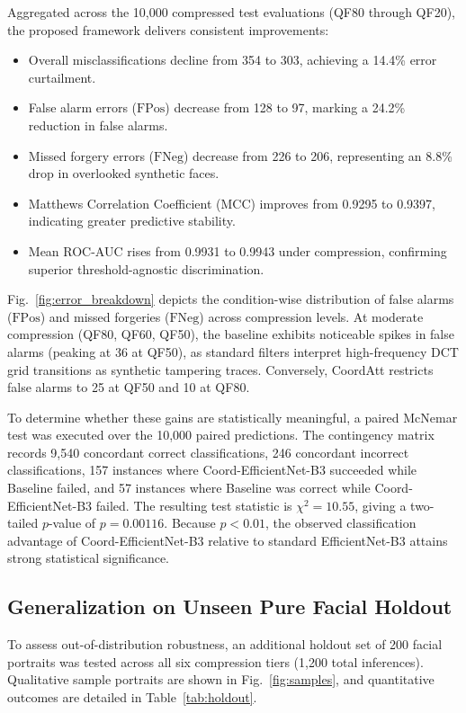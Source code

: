 \documentclass[conference]{IEEEtran}
\begin{document}
Aggregated across the 10,000 compressed test evaluations (QF80 through QF20), the proposed framework delivers consistent improvements:
\begin{itemize}
    \item Overall misclassifications decline from 354 to 303, achieving a 14.4\% error curtailment.
    \item False alarm errors ($\text{FPos}$) decrease from 128 to 97, marking a 24.2\% reduction in false alarms.
    \item Missed forgery errors ($\text{FNeg}$) decrease from 226 to 206, representing an 8.8\% drop in overlooked synthetic faces.
    \item Matthews Correlation Coefficient ($\text{MCC}$) improves from 0.9295 to 0.9397, indicating greater predictive stability.
    \item Mean ROC-AUC rises from 0.9931 to 0.9943 under compression, confirming superior threshold-agnostic discrimination.
\end{itemize}

Fig.~\ref{fig:error_breakdown} depicts the condition-wise distribution of false alarms ($\text{FPos}$) and missed forgeries ($\text{FNeg}$) across compression levels. At moderate compression (QF80, QF60, QF50), the baseline exhibits noticeable spikes in false alarms (peaking at 36 at QF50), as standard filters interpret high-frequency DCT grid transitions as synthetic tampering traces. Conversely, CoordAtt restricts false alarms to 25 at QF50 and 10 at QF80.

To determine whether these gains are statistically meaningful, a paired McNemar test was executed over the 10,000 paired predictions. The contingency matrix records 9,540 concordant correct classifications, 246 concordant incorrect classifications, 157 instances where Coord-EfficientNet-B3 succeeded while Baseline failed, and 57 instances where Baseline was correct while Coord-EfficientNet-B3 failed. The resulting test statistic is $\chi^2 = 10.55$, giving a two-tailed $p$-value of $p = 0.00116$. Because $p < 0.01$, the observed classification advantage of Coord-EfficientNet-B3 relative to standard EfficientNet-B3 attains strong statistical significance.

\subsection{Generalization on Unseen Pure Facial Holdout}
To assess out-of-distribution robustness, an additional holdout set of 200 facial portraits was tested across all six compression tiers (1,200 total inferences). Qualitative sample portraits are shown in Fig.~\ref{fig:samples}, and quantitative outcomes are detailed in Table~\ref{tab:holdout}.
\end{document}
